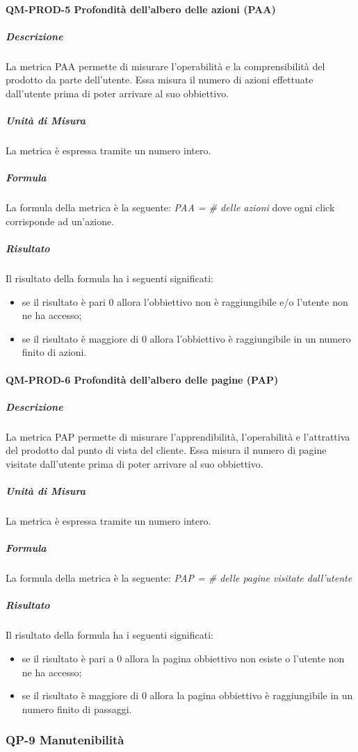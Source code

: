 		\paragraph{QM-PROD-5 Profondità dell'albero delle azioni (PAA)}
			\subparagraph{Descrizione}
				La metrica PAA permette di misurare l'operabilità e la comprensibilità del prodotto da parte dell'utente. Essa misura il numero di azioni effettuate dall'utente prima di poter arrivare al suo obbiettivo.
			\subparagraph{Unità di Misura}
				La metrica è espressa tramite un numero intero.
			\subparagraph{Formula}
				La formula della metrica è la seguente:
				\textit{PAA = \# delle azioni}
				dove ogni click corrisponde ad un'azione.
			\subparagraph{Risultato}
				Il risultato della formula ha i seguenti significati:
				\begin{itemize}
					\item se il risultato è pari 0 allora l'obbiettivo non è raggiungibile e/o l'utente non ne ha accesso;
					\item se il risultato è maggiore di 0 allora l'obbiettivo è raggiungibile in un numero finito di azioni.
				\end{itemize}
		\paragraph{QM-PROD-6 Profondità dell'albero delle pagine (PAP)}
			\subparagraph{Descrizione}
				La metrica PAP permette di misurare l'apprendibilità, l'operabilità e l'attrattiva del prodotto dal punto di vista del cliente. Essa misura il numero di pagine visitate dall'utente prima di poter arrivare al suo obbiettivo.
			\subparagraph{Unità di Misura}
				La metrica è espressa tramite un numero intero.
			\subparagraph{Formula}
				La formula della metrica è la seguente:
				\textit{PAP = \# delle pagine visitate dall'utente}
			\subparagraph{Risultato}
				Il risultato della formula ha i seguenti significati:
				\begin{itemize}
					\item se il risultato è pari a 0 allora la pagina obbiettivo non esiste o l'utente non ne ha accesso;
					\item se il risultato è maggiore di 0 allora la pagina obbiettivo è raggiungibile in un numero finito di passaggi.
				\end{itemize}

	\subsubsection{QP-9 Manutenibilità}
